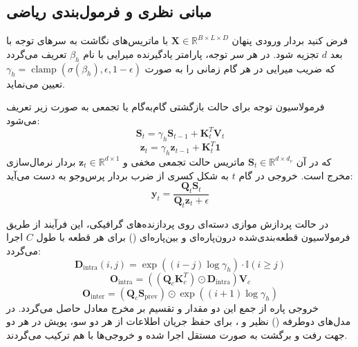 \subsection{مبانی نظری و فرمول‌بندی ریاضی}
فرض کنید بردار ورودی پنهان $\mathbf{X} \in \mathbb{R}^{B \times L \times D}$ با ماتریس‌های نگاشت به سرهای توجه با بعد $d$ تجزیه شود. در هر سر توجه، پارامتر یادگیرنده میرایی با نام $\beta_h$ تعریف می‌گردد که ضریب میرایی در هر گام زمانی را به صورت $\gamma_h = \operatorname{clamp}(\sigma(\beta_h), \epsilon, 1 - \epsilon)$ تعیین می‌نماید.

فرمولاسیون توجه برای حالت بازگشتی گام‌به‌گام یا تجمعی به صورت زیر تعریف می‌شود:
\begin{equation}
\mathbf{S}_t = \gamma_h \mathbf{S}_{t-1} + \mathbf{K}_t^T \mathbf{V}_t
\end{equation}
\begin{equation}
\mathbf{z}_t = \gamma_h \mathbf{z}_{t-1} + \mathbf{K}_t^T \mathbf{1}
\end{equation}
که در آن $\mathbf{S}_t \in \mathbb{R}^{d \times d_v}$ ماتریس حالت تجمعی مخفی و $\mathbf{z}_t \in \mathbb{R}^{d \times 1}$ بردار نرمال‌سازی مخرج است. خروجی در گام $t$ به شکل کسری از ضرب بردار پرس‌وجو به دست می‌آید:
\begin{equation}
\mathbf{y}_t = \frac{\mathbf{Q}_t \mathbf{S}_t}{\mathbf{Q}_t \mathbf{z}_t + \epsilon}
\end{equation}

در حالت پردازش موازی دسته‌ای روی پردازنده‌های گرافیکی، این فرآیند از طریق فرمولاسیون قطعه‌بندی‌شده درون‌پاره‌ای و بین‌پاره‌ای () برای هر قطعه با طول $C$ اجرا می‌گردد:
\begin{equation}
\mathbf{D}_{\text{intra}}(i, j) = \exp\left((i - j) \log \gamma_h\right) \cdot \mathbb{I}(i \ge j)
\end{equation}
\begin{equation}
\mathbf{O}_{\text{intra}} = \left( (\mathbf{Q}_c \mathbf{K}_c^T) \odot \mathbf{D}_{\text{intra}} \right) \mathbf{V}_c
\end{equation}
\begin{equation}
\mathbf{O}_{\text{inter}} = (\mathbf{Q}_c \mathbf{S}_{\text{prev}}) \odot \exp\left((i + 1) \log \gamma_h\right)
\end{equation}
خروجی پاره از جمع این دو مقدار و تقسیم بر مخرج معادل حاصل می‌گردد. در مدل‌های دوطرفه () نظیر  و ، برای حفظ جریان اطلاعات از هر دو سو، پویش در هر دو جهت رفت و برگشت به صورت مستقل اجرا شده و خروجی‌ها با هم ترکیب می‌گردند.

